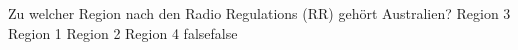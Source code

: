     {Zu welcher Region nach den Radio Regulations (RR) gehört Australien?}
    {Region 3}
    {Region 1}
    {Region 2}
    {Region 4}
    {false}{false}